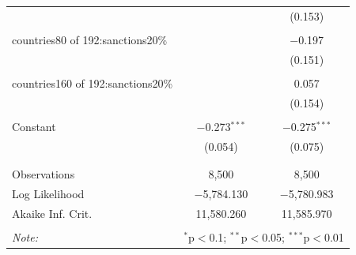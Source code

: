 \documentclass[12pt,letterpaper]{article}
\begin{document}
\begin{enumerate}
\begin{table}[!htbp]
\begin{tabular}{@{\extracolsep{5pt}}lcc}
			&  & (0.153) \\
			& & \\
			countries80 of 192:sanctions20\% &  & $-$0.197 \\
			&  & (0.151) \\
			& & \\
			countries160 of 192:sanctions20\% &  & 0.057 \\
			&  & (0.154) \\
			& & \\
			Constant & $-$0.273$^{***}$ & $-$0.275$^{***}$ \\
			& (0.054) & (0.075) \\
			& & \\
			\hline \\[-1.8ex]
			Observations & 8,500 & 8,500 \\
			Log Likelihood & $-$5,784.130 & $-$5,780.983 \\
			Akaike Inf. Crit. & 11,580.260 & 11,585.970 \\
			\hline
			\hline \\[-1.8ex]
			\textit{Note:} & \multicolumn{2}{r}{$^{*}$p$<$0.1; $^{**}$p$<$0.05; $^{***}$p$<$0.01} \\
		\end{tabular}
	\end{table}
\end{enumerate}
\end{document}
